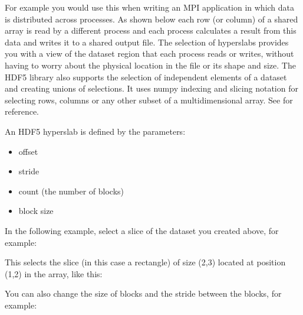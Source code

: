 \documentclass[letterpaper,10pt,english]{sphinxmanual}
\begin{document}
\noindent{}

\sphinxAtStartPar
For example you would use this when writing an MPI application in which data is distributed across processes.
As shown below each row (or column) of a shared array is read by a different process
and each process calculates a result from this data and writes it to a shared output file.
The selection of hyperslabs provides you with a view of the dataset region that each process reads or writes,
without having to worry about the physical location in the file or its shape and size.
The HDF5 library also supports the selection of independent elements of a dataset and creating unions of selections.
It uses numpy indexing and slicing notation for selecting rows, columns or any other subset of a multi\sphinxhyphen{}dimensional array.
See 
for reference.

\sphinxAtStartPar
An HDF5 hyperslab is defined by the parameters:
\begin{itemize}
\item {} 
\sphinxAtStartPar
offset

\item {} 
\sphinxAtStartPar
stride

\item {} 
\sphinxAtStartPar
count (the number of blocks)

\item {} 
\sphinxAtStartPar
block size

\end{itemize}

\noindent{}

\sphinxAtStartPar
In the following example, select a slice of the dataset you created above, for example:

\begin{sphinxVerbatim}[commandchars=\\\{\}]
  \PYG{p}{[} \PYG{p}{]}
\end{sphinxVerbatim}

\sphinxAtStartPar
This selects the slice (in this case a rectangle) of size (2,3) located at position (1,2) in the array, like this:

\noindent{}

\sphinxAtStartPar
You can also change the size of blocks and the stride between the blocks, for example:
\end{document}
